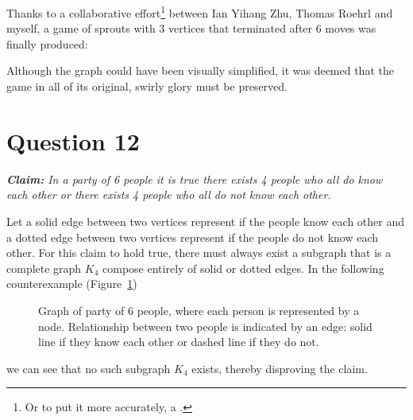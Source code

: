 \documentclass[11pt, oneside]{article}   	%
\begin{document}
Thanks to a collaborative effort\footnote{Or to put it more accurately, a .} between Ian Yihang Zhu, Thomas Roehrl and myself, a game of sprouts with 3 vertices that terminated after 6 moves was finally produced:

\vspace{6cm}

Although the graph could have been visually simplified, it was deemed that the game in all of its original, swirly glory must be preserved.



\cleardoublepage
\section*{Question 12}

\textit{\textbf{Claim:} In a party of 6 people it is true there exists 4 people who all do know each other or there exists 4 people who all do not know each other.}
\vspace{0.1cm}

Let a solid edge between two vertices represent if the people know each other and a dotted edge between two vertices represent if the people do not know each other. For this claim to hold true, there must always exist a subgraph that is a complete graph $K_4$ compose entirely of solid or dotted edges. In the following counterexample (Figure~\ref{party of 6})

\begin{figure}[h]
\centering

\caption{Graph of party of 6 people, where each person is represented by a node. Relationship between two people is indicated by an edge: solid line if they know each other or dashed line if they do not.}
\label{party of 6}
\end{figure}

we can see that no such subgraph $K_4$ exists, thereby disproving the claim.
\end{document}
